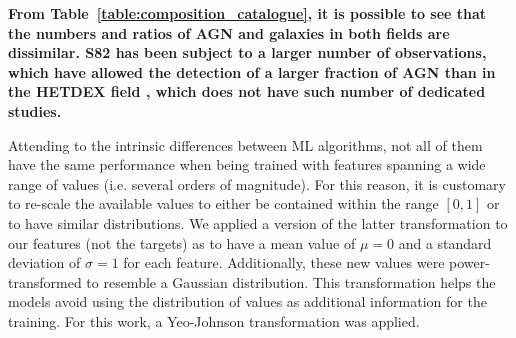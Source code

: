 \documentclass{aa}
\begin{document}
\begin{table}
\setlength{\tabcolsep}{3pt}
\caption{Composition of initial catalogue and number of cross matches with additional surveys and catalogues.}             %
\label{table:composition_catalogue}      %
\centering                          %
\end{table}

\textbf{From Table~\ref{table:composition_catalogue}, it is possible to see that the numbers and ratios of AGN and galaxies in both fields are dissimilar. S82 has been subject to a larger number of observations, which have allowed the detection of a larger fraction of AGN than in the HETDEX field \citep[see, for instance,][]{2020ApJS..250....8L}, which does not have such number of dedicated studies.}

Attending to the intrinsic differences between ML algorithms, not all of them have the same performance when being trained with features spanning a wide range of values (i.e. several orders of magnitude). For this reason, it is customary to re-scale the available values to either be contained within the range $[0, 1]$ or to have similar distributions. We applied a version of the latter transformation to our features (not the targets) as to have a mean value of $\mu = 0$ and a standard deviation of $\sigma = 1$ for each feature. Additionally, these new values were power-transformed to resemble a Gaussian distribution. This transformation helps the models avoid using the distribution of values as additional information for the training. For this work, a Yeo-Johnson transformation \citep{10.1093/biomet/87.4.954} was applied.
\end{document}
